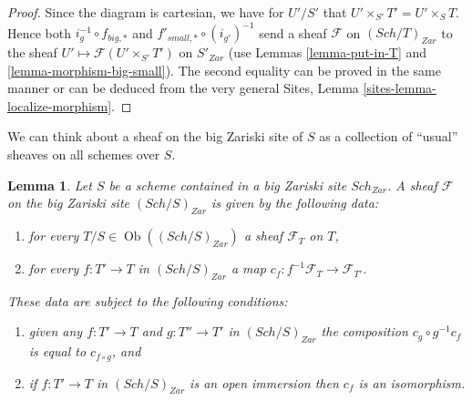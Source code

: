\documentclass{stacks-project}
\theoremstyle{plain}
\newtheorem{lemma}[subsection]{Lemma}
\theoremstyle{definition}
\theoremstyle{remark}
\numberwithin{equation}{subsection}
\def\Sch{\mathit{Sch}}
\def\Ob{\mathop{\mathrm{Ob}}\nolimits}
\begin{document}
\begin{proof}
Since the diagram is cartesian, we have for $U'/S'$
that $U' \times_{S'} T' = U' \times_S T$. Hence both
$i_g^{-1} \circ f_{big, *}$ and $f'_{small, *} \circ (i_{g'})^{-1}$
send a sheaf $\mathcal{F}$ on $(\Sch/T)_{Zar}$ to the sheaf
$U' \mapsto \mathcal{F}(U' \times_{S'} T')$ on $S'_{Zar}$
(use Lemmas \ref{lemma-put-in-T} and \ref{lemma-morphism-big-small}).
The second equality can be proved in the same manner or can be
deduced from the very general
Sites, Lemma \ref{sites-lemma-localize-morphism}.
\end{proof}

\noindent
We can think about a sheaf on the big Zariski site of $S$ as a collection
of ``usual'' sheaves on all schemes over $S$.

\begin{lemma}
\label{lemma-characterize-sheaf-big}
Let $S$ be a scheme contained in a big Zariski site $\Sch_{Zar}$.
A sheaf $\mathcal{F}$ on the big Zariski site $(\Sch/S)_{Zar}$
is given by the following data:
\begin{enumerate}
\item for every $T/S \in \Ob((\Sch/S)_{Zar})$ a sheaf
$\mathcal{F}_T$ on $T$,
\item for every $f : T' \to T$ in
$(\Sch/S)_{Zar}$ a map
$c_f : f^{-1}\mathcal{F}_T \to \mathcal{F}_{T'}$.
\end{enumerate}
These data are subject to the following conditions:
\begin{enumerate}
\item[(a)] given any $f : T' \to T$ and $g : T'' \to T'$ in
$(\Sch/S)_{Zar}$ the composition $c_g \circ g^{-1}c_f$
is equal to $c_{f \circ g}$, and
\item[(b)] if $f : T' \to T$ in $(\Sch/S)_{Zar}$ is an
open immersion then $c_f$ is an isomorphism.
\end{enumerate}
\end{lemma}
\end{document}
